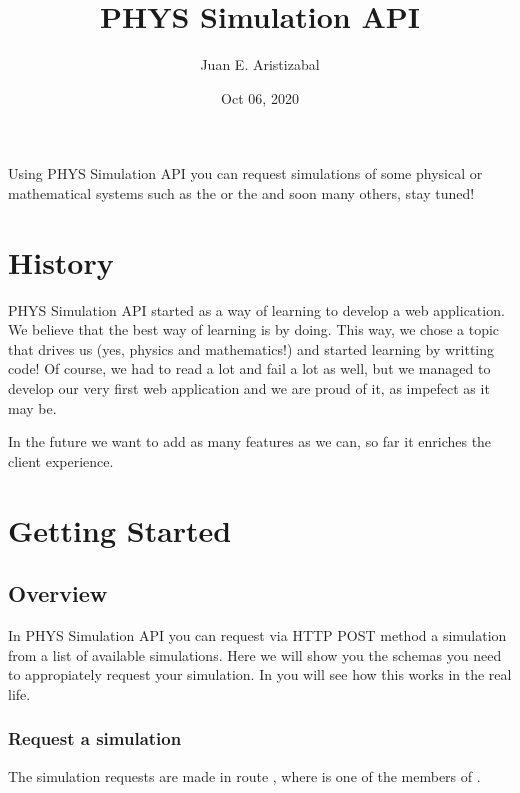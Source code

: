 \documentclass[a4paper,landscape,10pt,english]{sphinxmanual}
\title{PHYS Simulation API}
\date{Oct 06, 2020}
\author{Juan E.\@{} Aristizabal}
\begin{document}
\pagestyle{empty}
\sphinxmaketitle
\pagestyle{plain}
\sphinxtableofcontents
\pagestyle{normal}
\label{\detokenize{index::doc}}


Using PHYS Simulation API you can request simulations of some physical or
mathematical systems such as the  or the
 \textendash{}and soon many others, stay tuned!


\chapter{History}
\label{\detokenize{index:history}}
PHYS Simulation API started as a way of learning to develop a web application.
We believe that the best way of learning is by doing. This way, we chose
a topic that drives us (yes, physics and mathematics!) and started learning by
writting code! Of course, we had to read a lot and fail a lot as well, but
we managed to develop our very first web application and we are proud of it, as
impefect as it may be.

In the future we want to add as many features as we can, so far it enriches
the client experience.


\chapter{Getting Started}
\label{\detokenize{index:getting-started}}

\section{Overview}
\label{\detokenize{start/overview:overview}}\label{\detokenize{start/overview:start-overview}}\label{\detokenize{start/overview::doc}}
In PHYS Simulation API you can request \textendash{}via HTTP POST method\textendash{} a simulation from
a list of available simulations. Here we will show you the schemas you need to
appropiately request your simulation. In {\hyperref[\detokenize{start/examples:start-examples}]{}} you
will see how this works in the real life.


\subsection{Request a simulation}
\label{\detokenize{start/overview:request-a-simulation}}
The simulation requests are made in route ,
where  is one of the members of
{\hyperref[\detokenize{code_docs/simulation_API.controller:simulation_API.controller.schemas.SimSystem}]{}}.
\end{document}
